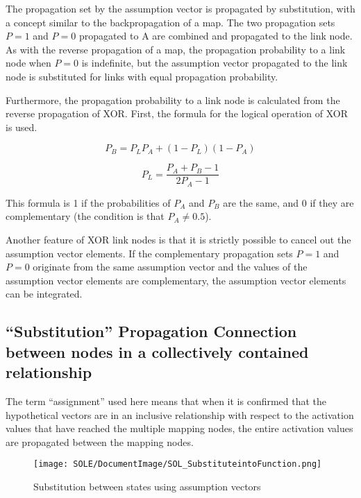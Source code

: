 \documentclass[12pt]{article}
\begin{document}
The propagation set by the assumption vector is propagated by
substitution, with a concept similar to the backpropagation of a map.
The two propagation sets \(P=1\) and \(P=0\) propagated to A are
combined and propagated to the link node. As with the reverse
propagation of a map, the propagation probability to a link node when
\(P=0\) is indefinite, but the assumption vector propagated to the link
node is substituted for links with equal propagation probability.

Furthermore, the propagation probability to a link node is calculated
from the reverse propagation of XOR. First, the formula for the logical
operation of XOR is used.

\[ P_B=P_LP_A+(1-P_L)(1-P_A)\]

\[ P_L=\frac{P_A+P_B-1}{2P_A-1}\]

This formula is 1 if the probabilities of \(P_A\) and \(P_B\) are the
same, and 0 if they are complementary (the condition is that
\(P_A\neq 0.5\)).

Another feature of XOR link nodes is that it is strictly possible to
cancel out the assumption vector elements. If the complementary
propagation sets \(P=1\) and \(P=0\) originate from the same assumption
vector and the values \hspace{0pt}\hspace{0pt}of the assumption vector
elements are complementary, the assumption vector elements can be
integrated.

\subsection{``Substitution'' Propagation Connection between nodes in
a collectively contained
relationship}\label{substitution-propagation-connection-between-nodes-in-a-collectively-contained-relationship}

The term ``assignment'' used here means that when it is confirmed that
the hypothetical vectors are in an inclusive relationship with respect
to the activation values \hspace{0pt}\hspace{0pt}that have reached the
multiple mapping nodes, the entire activation values
\hspace{0pt}\hspace{0pt}are propagated between the mapping nodes.

\begin{figure}[ht]
  \centering
  \texttt{[image: SOLE/DocumentImage/SOL\_SubstituteintoFunction.png]}
  \caption{Substitution between states using assumption vectors}
  \label{fig:substitution_between_states_using_assumption_vectors}
\end{figure}
\end{document}
